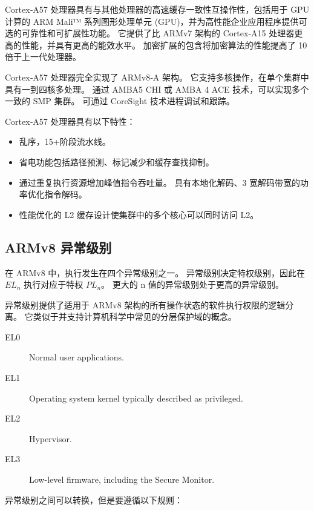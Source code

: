 Cortex‑A57 处理器具有与其他处理器的高速缓存一致性互操作性，包括用于 GPU 计算的 ARM Mali™ 系列图形处理单元 (GPU)，并为高性能企业应用程序提供可选的可靠性和可扩展性功能。
它提供了比 ARMv7 架构的 Cortex‑A15 处理器更高的性能，并具有更高的能效水平。
加密扩展的包含将加密算法的性能提高了 10 倍于上一代处理器。


Cortex‑A57 处理器完全实现了 ARMv8‑A 架构。
它支持多核操作，在单个集群中具有一到四核多处理。
通过 AMBA5 CHI 或 AMBA 4 ACE 技术，可以实现多个一致的 SMP 集群。
可通过 CoreSight 技术进程调试和跟踪。

Cortex‑A57 处理器具有以下特性：

\begin{itemize}
  \item 乱序，15+阶段流水线。
  \item 省电功能包括路径预测、标记减少和缓存查找抑制。
  \item 通过重复执行资源增加峰值指令吞吐量。
  具有本地化解码、3 宽解码带宽的功率优化指令解码。
  \item 性能优化的 L2 缓存设计使集群中的多个核心可以同时访问 L2。
\end{itemize}

\subsection{ARMv8 异常级别}

在 ARMv8 中，执行发生在四个异常级别之一。
异常级别决定特权级别，因此在 $EL_n$ 执行对应于特权 $PL_n$。
更大的 n 值的异常级别处于更高的异常级别。

异常级别提供了适用于 ARMv8 架构的所有操作状态的软件执行权限的逻辑分离。
它类似于并支持计算机科学中常见的分层保护域的概念。

\begin{description}
    \item[EL0] Normal user applications.
    \item[EL1] Operating system kernel typically described as privileged.
    \item[EL2] Hypervisor.
    \item[EL3] Low-level firmware, including the Secure Monitor.
\end{description}

异常级别之间可以转换，但是要遵循以下规则：

